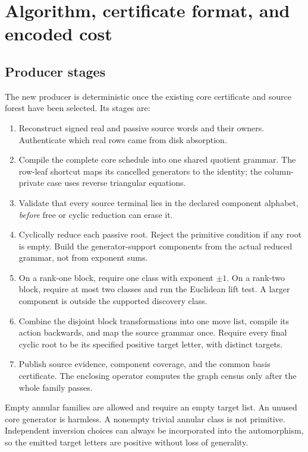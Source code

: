 \documentclass[11pt,a4paper]{article}
\theoremstyle{definition}
\theoremstyle{remark}
\begin{document}
\section{Algorithm, certificate format, and encoded cost}
\label{sec:algorithm}

\subsection{Producer stages}

The new producer is deterministic once the existing core certificate and
source forest have been selected. Its stages are:

\begin{enumerate}
\item Reconstruct signed real and passive source words and their owners.
Authenticate which real rows came from disk absorption.
\item Compile the complete core schedule into one shared quotient grammar.
The row-leaf shortcut maps its cancelled generators to the identity; the
column-private case uses reverse triangular equations.
\item Validate that every source terminal lies in the declared component
alphabet, \emph{before} free or cyclic reduction can erase it.
\item Cyclically reduce each passive root. Reject the primitive condition
if any root is empty. Build the generator-support components from the
actual reduced grammar, not from exponent sums.
\item On a rank-one block, require one class with exponent $\pm1$. On a
rank-two block, require at most two classes and run the Euclidean lift test.
A larger component is outside the supported discovery class.
\item Combine the disjoint block transformations into one move list, compile
its action backwards, and map the source grammar once. Require every final
cyclic root to be its specified positive target letter, with distinct targets.
\item Publish source evidence, component coverage, and the common basis
certificate. The enclosing operator computes the graph census only after
the whole family passes.
\end{enumerate}

Empty annular families are allowed and require an empty target list. An
unused core generator is harmless. A nonempty trivial annular class is not
primitive. Independent inversion choices can always be incorporated into
the automorphism, so the emitted target letters are positive without loss
of generality.
\end{document}
